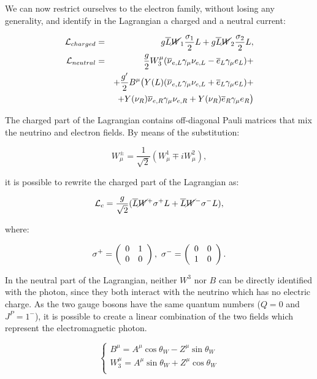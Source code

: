 We can now restrict ourselves to the electron family, without losing any generality, and identify in the Lagrangian a charged and a neutral current:

\begin{eqnarray}
\mathcal{L}_{charged} &=& g \overline{L} \cancel{W}_1 \dfrac{\sigma_1}{2}L + g \overline{L} \cancel{W}_2 \dfrac{\sigma_2}{2}L, \\ 
\mathcal{L}_{neutral} &=& \dfrac{g}{2} W_3^\mu (\overline{\nu}_{e,L}\gamma_\mu\nu_{e,L} - \overline{e}_L\gamma_\mu e_L) +  \nonumber \\
& & + \dfrac{g'}{2} B^\mu \mathbf{\big(} Y(L) ( \overline{\nu}_{e,L}\gamma_\mu\nu_{e,L} + \overline{e}_L\gamma_\mu e_L ) + \nonumber \\
& & + Y(\nu_R) \overline{\nu}_{e,R}\gamma_\mu\nu_{e,R} + Y(\nu_R)  \overline{e}_R\gamma_\mu e_R \mathbf{\big)}
\end{eqnarray}

The charged part of the Lagrangian contains off-diagonal Pauli matrices that mix the neutrino and electron fields. By means of the substitution:

\begin{equation}
W^\pm_\mu = \frac{1}{\sqrt{2}}(W^{1}_{\mu} \mp i W^{2}_{\mu}),
\label{eq:wpm_def}
\end{equation}

it is possible to rewrite the charged part of the Lagrangian as:

\begin{equation}
\mathcal{L}_c = \frac{g}{\sqrt{2}}(\overline{L}\cancel{W}^{+} \sigma^{+} L +\overline{L}\cancel{W}^{-}\sigma^{-} L),
\end{equation}

where:

\begin{equation}
\sigma^+ = \left(\begin{array}{cc}0 & 1 \\0 & 0\end{array}\right),\,\, \sigma^- = \left(\begin{array}{cc}0 & 0 \\1 & 0\end{array}\right).
\end{equation}

In the neutral part of the Lagrangian, neither $W^3$ nor $B$ can be directly identified with the photon, since they both interact with the neutrino which has no electric charge. As the two gauge bosons have the same quantum numbers ($Q = 0$ and $J^P = 1^-$), it is possible to create a linear combination of the two fields which represent the electromagnetic photon.

\begin{equation}
\left\{\begin{matrix}
B^{\mu}=A^{\mu}\operatorname{cos}\theta_{W}-Z^{\mu}\operatorname{sin}\theta_{W}\\ 

W^{\mu}_3=A^{\mu}\operatorname{sin}\theta_{W}+Z^{\mu}\cos\theta_{W}\\ 
\end{matrix}\right.
\label{eq:su2_rotation}
\end{equation}

